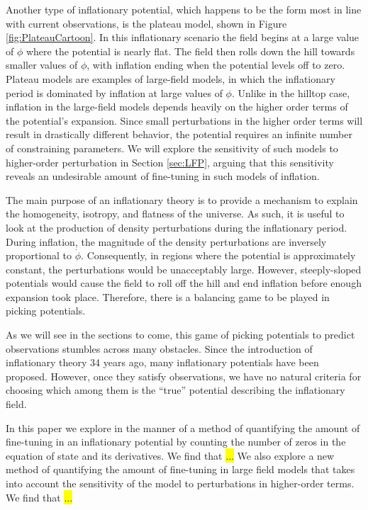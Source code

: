 \documentclass[a4paper,11pt]{article}
\newcommand{\hl}[1]{\colorbox{yellow}{#1}}
\begin{document}
Another type of inflationary potential, which happens to be the form most in line with current observations, is the plateau model, shown in Figure \ref{fig:PlateauCartoon}. In this inflationary scenario the field begins at a large value of $\phi$ where the potential is nearly flat. The field then rolls down the hill towards smaller values of $\phi$, with inflation ending when the potential levels off to zero. Plateau models are examples of large-field models, in which the inflationary period is dominated by inflation at large values of $\phi$. Unlike in the hilltop case, inflation in the large-field models depends heavily on the higher order terms of the potential's expansion. Since small perturbations in the higher order terms will result in drastically different behavior, the potential requires an infinite number of constraining parameters. We will explore the sensitivity of such models to higher-order perturbation in Section \ref{sec:LFP}, arguing that this sensitivity reveals an undesirable amount of fine-tuning in such models of inflation.

The main purpose of an inflationary theory is to provide a mechanism to explain the homogeneity, isotropy, and flatness of the universe. As such, it is useful to look at the production of density perturbations during the inflationary period. During inflation, the magnitude of the density perturbations are inversely proportional to $\dot \phi$. Consequently, in regions where the potential is approximately constant, the perturbations would be unacceptably large. However, steeply-sloped potentials would cause the field to roll off the hill and end inflation before enough expansion took place. Therefore, there is a balancing game to be played in picking potentials. 

As we will see in the sections to come, this game of picking potentials to predict observations stumbles across many obstacles. Since the introduction of inflationary theory 34 years ago, many inflationary potentials have been proposed. However, once they satisfy observations, we have no natural criteria for choosing which among them is the ``true'' potential describing the inflationary field. 

In this paper we explore in the manner of \citet{Boyle+2006} a method of quantifying the amount of fine-tuning in an inflationary potential by counting the number of zeros in the equation of state and its derivatives. We find that \hl{...} We also explore a new method of quantifying the amount of fine-tuning in large field models that takes into account the sensitivity of the model to perturbations in higher-order terms. We find that \hl{...}
\end{document}
